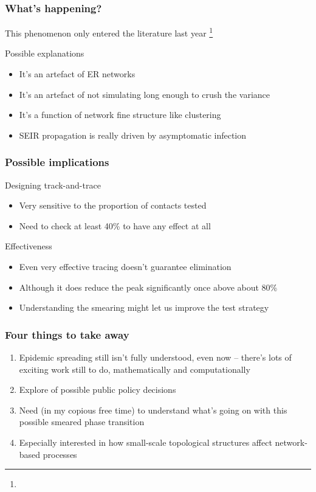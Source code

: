 \documentclass{beamer}
\renewcommand{\cite}[1]{
  \footnote[frame]{\tiny{\bibentry{#1}}}
}
\begin{document}
\begin{frame}
  \frametitle{What's happening?}

  \begin{block}{This phenomenon only entered the literature last year\cite{Smeared-19}}  
  \end{block}

  \begin{block}{Possible explanations}
    \begin{itemize}
    \item It's an artefact of ER networks
    \item It's an artefact of not simulating long enough to crush
      the variance
    \item It's a function of network fine structure like clustering
    \item SEIR propagation is really driven by asymptomatic infection
    \end{itemize}
  \end{block}
\end{frame}

\begin{frame}
  \frametitle{Possible implications}

  \begin{block}{Designing track-and-trace}
    \begin{itemize}
    \item Very sensitive to the proportion of contacts tested
    \item Need to check at least 40\% to have any effect at all
    \end{itemize}
  \end{block}

  \begin{block}{Effectiveness}
    \begin{itemize}
    \item Even very effective tracing doesn't guarantee elimination
    \item Although it does reduce the peak significantly once above
      about 80\%
    \item Understanding the smearing might let us improve the test
      strategy
    \end{itemize}
  \end{block}
\end{frame}

\begin{frame}
  \frametitle{Four things to take away}

  \begin{enumerate}
  \item Epidemic spreading still isn't fully understood, even now --
    there's lots of exciting work still to do, mathematically and computationally
  \item Explore of possible public policy decisions 
  \item Need (in my copious free time) to understand what's going on
    with this possible smeared phase transition
  \item Especially interested in how small-scale topological
    structures affect network-based processes
  \end{enumerate}
\end{frame}
\end{document}
